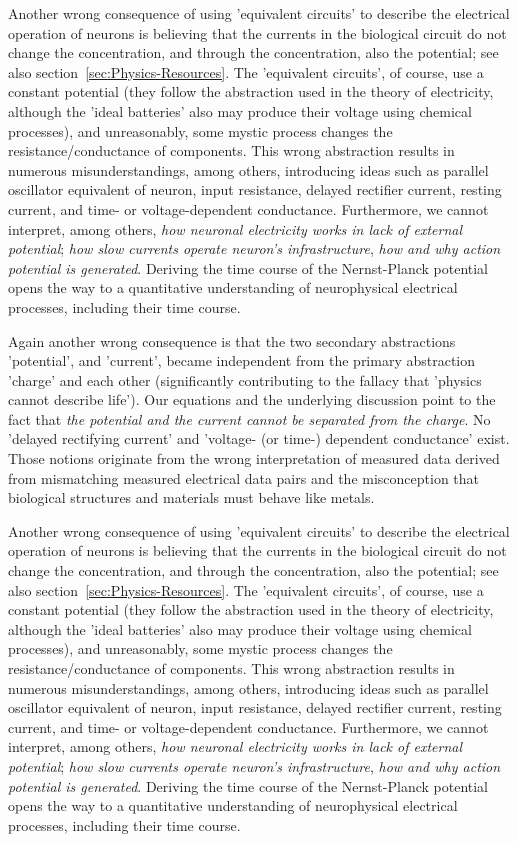 \ifx\magyar\undefined
Another wrong consequence of using 'equivalent circuits' to describe
the electrical operation of neurons is believing that the currents in
the biological circuit do not change the concentration, and through
the concentration, also the potential; see also section~\ref{sec:Physics-Resources}. The 'equivalent circuits',
of course, use a constant potential (they follow the abstraction used
in the theory of electricity, although the 'ideal batteries' also
may produce their voltage using chemical processes), and unreasonably, some mystic process changes the resistance/conductance of components. This wrong abstraction
results in numerous misunderstandings, among others, introducing ideas
such as parallel oscillator equivalent of neuron, input resistance,
delayed rectifier current, resting current, and time- or voltage-dependent
conductance. Furthermore, we cannot 
interpret, among others, \emph{how neuronal electricity
works in lack of external potential}; \emph{how slow currents operate
neuron's infrastructure}, \emph{how and why action potential is generated}.
Deriving the time course of the Nernst-Planck potential opens the
way to a quantitative understanding of neurophysical electrical processes,
including their time course.

Again another wrong consequence is that the two secondary abstractions 'potential',
and 'current', became independent from the primary abstraction 'charge'
and each other (significantly contributing to the fallacy that 'physics cannot describe life'). Our equations and the underlying discussion point
to the fact that \emph{the potential and the current cannot be separated
from the charge}. No 'delayed rectifying current' and 'voltage- (or
time-) dependent conductance' exist. Those notions originate from
the wrong interpretation of measured data derived from mismatching
measured electrical data pairs and the misconception that biological
structures and materials must behave like metals.

\else

Another wrong consequence of using 'equivalent circuits' to describe
the electrical operation of neurons is believing that the currents in
the biological circuit do not change the concentration, and through
the concentration, also the potential; see also section~\ref{sec:Physics-Resources}. The 'equivalent circuits',
of course, use a constant potential (they follow the abstraction used
in the theory of electricity, although the 'ideal batteries' also
may produce their voltage using chemical processes), and unreasonably, some mystic process changes the resistance/conductance of components. This wrong abstraction
results in numerous misunderstandings, among others, introducing ideas
such as parallel oscillator equivalent of neuron, input resistance,
delayed rectifier current, resting current, and time- or voltage-dependent
conductance. Furthermore, we cannot 
interpret, among others, \emph{how neuronal electricity
works in lack of external potential}; \emph{how slow currents operate
neuron's infrastructure}, \emph{how and why action potential is generated}.
Deriving the time course of the Nernst-Planck potential opens the
way to a quantitative understanding of neurophysical electrical processes,
including their time course.

